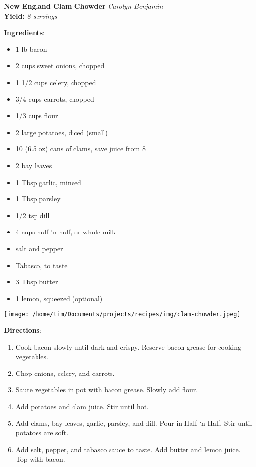 \documentclass[11pt, twoside, openany]{book}
\begin{document}
\noindent\begin{minipage}[t]{\linewidth}%
{\Large\textbf{New England Clam Chowder}} \label{new-england-clam-chowder}\hfill\textit{Carolyn Benjamin}\\
\textbf{Yield:} \textit{8 servings}\\
\noindent\begin{minipage}[t]{0.78\linewidth}%
\textbf{Ingredients}:\vspace{-3mm}
\begin{multicols}{2}
\begin{itemize}\setlength\itemsep{-1mm}
\item 1 lb bacon
\item 2 cups sweet onions, chopped
\item 1 1/2 cups celery, chopped
\item 3/4 cups carrots, chopped
\item 1/3 cups flour
\item 2 large potatoes, diced (small)
\item 10 (6.5 oz) cans of clams, save juice from 8
\item 2 bay leaves
\item 1 Tbsp garlic, minced
\item 1 Tbsp parsley
\item 1/2 tsp dill
\item 4 cups half 'n half, or whole milk
\item salt and pepper
\item Tabasco, to taste
\item 3 Tbsp butter
\item 1 lemon, squeezed (optional)
\end{itemize}
\end{multicols}
\end{minipage}
\noindent\begin{minipage}[t]{0.18\linewidth}
\centering \strut\vspace*{-\baselineskip}\newline
\texttt{[image: /home/tim/Documents/projects/recipes/img/clam-chowder.jpeg]}\\
\end{minipage}\vspace{3mm}
\textbf{Directions}:
\vspace{-3mm}\begin{enumerate}\setlength\itemsep{-1mm}
\item Cook bacon slowly until dark and crispy. Reserve bacon grease for cooking vegetables.
\item  Chop onions, celery, and carrots.
\item  Saute vegetables in pot with bacon grease. Slowly add flour.
\item Add potatoes and clam juice. Stir until hot.
\item Add clams, bay leaves, garlic, parsley, and dill. Pour in Half ‘n Half. Stir until potatoes are soft.
\item Add salt, pepper, and tabasco sauce to taste. Add butter and lemon juice. Top with bacon.
\end{enumerate}
\end{minipage}\vspace{8mm}
\end{document}
